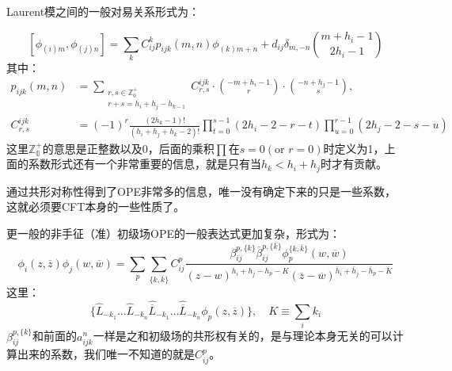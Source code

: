 Laurent模之间的一般对易关系形式为：
\begin{theorem}
	\begin{equation}
		\boxed{\left[\phi_{(i)m},\phi_{(j)n}\right]=\sum_kC_{ij}^kp_{ijk}(m,n)\phi_{(k)m+n}+d_{ij}\delta_{m,-n}\binom{m+h_i-1}{2h_i-1}}
	\end{equation}
	其中：
	\begin{equation}
		\begin{aligned}p_{ijk}(m,n)&=\sum_{\substack{r,s\in\mathbb{Z}_0^+\\r+s=h_i+h_j-h_{k-1}}}C_{r,s}^{ijk}\cdot\binom{-m+h_i-1}{r}\cdot\binom{-n+h_j-1}{s},\\C_{r,s}^{ijk}&=(-1)^r\frac{(2h_k-1)!}{(h_i+h_j+h_k-2)!}\prod_{t=0}^{s-1}(2h_i-2-r-t)\prod_{u=0}^{r-1}(2h_j-2-s-u)\end{aligned}
	\end{equation}
	这里$\mathbb{Z_0^+}$的意思是正整数以及0，后面的乘积$\prod$在$s=0(\text{or }r=0)$时定义为1，上面的系数形式还有一个非常重要的信息，就是只有当$h_k<h_i+h_j$时才有贡献。
\end{theorem}
通过共形对称性得到了OPE非常多的信息，唯一没有确定下来的只是一些系数，这就必须要CFT本身的一些性质了。

更一般的非手征（准）初级场OPE的一般表达式更加复杂，形式为：
\begin{equation}
	\boxed{
		\phi_i(z,\overline{z})\phi_j(w,\overline{w})=\sum_{p}\sum_{\{k,\overline{k}\}}C_{ij}^p\frac{\beta_{ij}^{p,\{k\}}\overline{\beta}_{ij}^{p,\{\overline{k}\}}\phi_{p}^{\{k,\overline{k}\}}(w,\overline{w})}{(z-w)^{h_i+h_j-h_p-K}(\overline{z}-\overline{w})^{\overline{h}_i+\overline{h}_j-\overline{h}_p-\overline{K}}}
	}
\end{equation}
这里：
\begin{equation}
	\{\hat{L}_{-k_1}\ldots\hat{L}_{-k_n}\hat{\overline{L}}_{-k_1}\ldots\hat{\overline{L}}_{-k_n}\phi_p(z,\overline{z})\},\quad K\equiv\sum_i k_i
\end{equation}
$\beta_{ij}^{p,\{k\}}$和前面的$a^n_{ijk}$一样是之和初级场的共形权有关的，是与理论本身无关的可以计算出来的系数，我们唯一不知道的就是$C_{ij}^p$。
